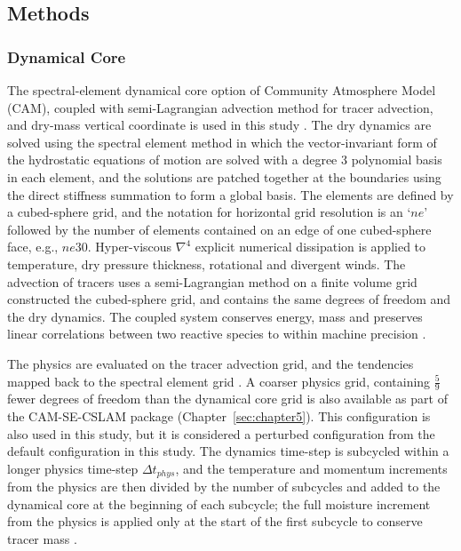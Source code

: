 \subsection{Methods}

\subsubsection{Dynamical Core}

The spectral-element dynamical core option of Community Atmosphere Model (CAM), coupled with semi-Lagrangian advection method for tracer advection, and dry-mass vertical coordinate is used in this study \citep{LTOUNGK2017MWR,LetAl2018JAMES,HL2018MWR}. The dry dynamics are solved using the spectral element method in which the vector-invariant form of the hydrostatic equations of motion are solved with a degree 3 polynomial basis in each element, and the solutions are patched together at the boundaries using the direct stiffness summation to form a global basis. The elements are defined by a cubed-sphere grid, and the notation for horizontal grid resolution is an `$ne$' followed by the number of elements contained on an edge of one cubed-sphere face, e.g., $ne30$. Hyper-viscous $\nabla^{4}$ explicit numerical dissipation is applied to temperature, dry pressure thickness, rotational and divergent winds. The advection of tracers uses a semi-Lagrangian method on a finite volume grid constructed the cubed-sphere grid, and contains the same degrees of freedom and the dry dynamics. The coupled system conserves energy, mass and preserves linear correlations between two reactive species to within machine precision \citep{HL2018MWR}.

The physics are evaluated on the tracer advection grid, and the tendencies mapped back to the spectral element grid \citep{HL2018MWR}. A coarser physics grid, containing $\frac{5}{9}$ fewer degrees of freedom than the dynamical core grid is also available as part of the CAM-SE-CSLAM package (Chapter~\ref{sec:chapter5}). This configuration is also used in this study, but it is considered a perturbed configuration from the default configuration in this study. The dynamics time-step is subcycled within a longer physics time-step $\Delta t_{phys}$, and the temperature and momentum increments from the physics are then divided by the number of subcycles and added to the dynamical core at the beginning of each subcycle; the full moisture increment from the physics is applied only at the start of the first subcycle to conserve tracer mass \citep[$ftype=2$ option in][]{LW2019JAMES}. 

